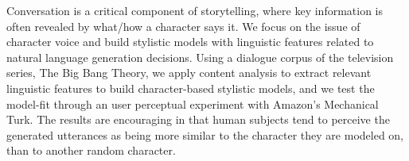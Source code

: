 Conversation is a critical component of storytelling, where key information is often revealed by what/how a character says it. We focus on the issue of character voice and build stylistic models with linguistic features related to natural language generation decisions. Using a dialogue corpus of the television series, The Big Bang Theory, we apply content analysis to extract relevant linguistic features to build character-based stylistic models, and we test the model-fit through an user perceptual experiment with Amazon's Mechanical Turk. The results are encouraging in that human subjects tend to perceive the generated utterances as being more similar to the character they are modeled on, than to another random character.
